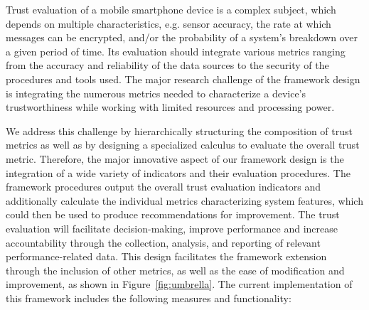 Trust evaluation of a mobile smartphone device is a complex subject, which depends on multiple characteristics, 
e.g. sensor accuracy, the rate at which messages can be encrypted,  %
 and/or the probability of a system's breakdown over a given period of time. Its evaluation should integrate various 
 metrics ranging from the accuracy and reliability of the data sources to the security of the procedures and tools 
 used. The major research challenge of the framework design is integrating the numerous metrics needed to characterize
 a device's trustworthiness while working with limited resources and processing power. 
 
We address this challenge by hierarchically structuring the composition of trust metrics as well as by designing a specialized calculus to evaluate the overall trust metric. 
Therefore, the major innovative aspect of our framework design is the integration of a wide variety of indicators and their evaluation procedures. The framework procedures output the overall trust evaluation indicators and additionally 
calculate the individual metrics characterizing system features, which could then be used to produce recommendations for improvement. 
The trust evaluation will facilitate decision-making, improve performance and increase accountability through the collection, 
analysis, and reporting of relevant performance-related data. This design facilitates the framework extension through the 
inclusion of other metrics, as well as the ease of modification and improvement, as shown in Figure~\ref{fig:umbrella}.
The current implementation of this framework includes the following measures and functionality: 

